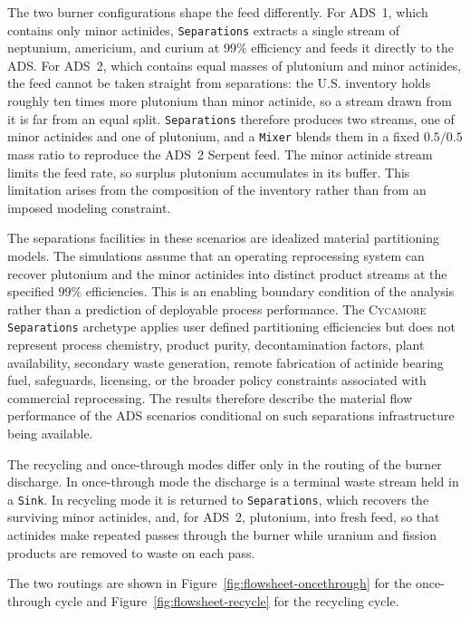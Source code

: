 The two burner configurations shape the feed differently. For
ADS~1, which contains only minor actinides, \texttt{Separations} extracts a
single stream of neptunium, americium, and curium at \(99\%\) efficiency and feeds it directly
to the \gls{ADS}. For ADS~2, which contains equal masses of plutonium and minor actinides, the
feed cannot be taken straight from separations: the U.S. inventory holds roughly ten times more
plutonium than minor actinide, so a stream drawn from it is far from an equal
split. \texttt{Separations} therefore produces two streams, one of minor
actinides and one of plutonium, and a \Cycamore \texttt{Mixer} blends them in a
fixed \(0.5/0.5\) mass ratio to reproduce the ADS~2 Serpent feed. The minor
actinide stream limits the feed rate, so surplus plutonium
accumulates in its buffer. This limitation arises from the composition of the
inventory rather than from an imposed modeling constraint.

The separations facilities in these scenarios are idealized material
partitioning models. The simulations assume that an operating reprocessing
system can recover plutonium and the minor actinides into distinct product
streams at the specified \(99\%\) efficiencies. This is an enabling boundary
condition of the analysis rather than a prediction of deployable process
performance. The \textsc{Cycamore} \texttt{Separations} archetype applies
user defined partitioning efficiencies but does not represent process
chemistry, product purity, decontamination factors, plant availability,
secondary waste generation, remote fabrication of actinide bearing fuel,
safeguards, licensing, or the broader policy constraints associated with
commercial reprocessing. The results therefore describe the material flow
performance of the ADS scenarios conditional on such separations
infrastructure being available.

The recycling and once-through modes differ only in the routing of the burner
discharge. In once-through mode the discharge is a terminal waste stream held in
a \texttt{Sink}. In recycling mode it is returned to \texttt{Separations}, which
recovers the surviving minor actinides, and, for ADS~2, plutonium, into fresh
feed, so that actinides make repeated passes through the burner while uranium and
fission products are removed to waste on each pass.

The two routings are shown in Figure~\ref{fig:flowsheet-oncethrough} for the
once-through cycle and Figure~\ref{fig:flowsheet-recycle} for the recycling cycle.

